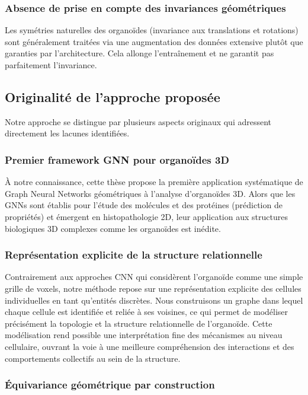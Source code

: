 \subsubsection{Absence de prise en compte des invariances géométriques}

Les symétries naturelles des organoïdes (invariance aux translations et rotations) sont généralement traitées via une augmentation des données extensive plutôt que garanties par l'architecture. Cela allonge l'entraînement et ne garantit pas parfaitement l'invariance.

\subsection{Originalité de l'approche proposée}

Notre approche se distingue par plusieurs aspects originaux qui adressent directement les lacunes identifiées.

\subsubsection{Premier framework GNN pour organoïdes 3D}

À notre connaissance, cette thèse propose la première application systématique de Graph Neural Networks géométriques à l'analyse d'organoïdes 3D. Alors que les GNNs sont établis pour l'étude des molécules et des protéines (prédiction de propriétés) et émergent en histopathologie 2D, leur application aux structures biologiques 3D complexes comme les organoïdes est inédite.

\subsubsection{Représentation explicite de la structure relationnelle}

Contrairement aux approches CNN qui considèrent l’organoïde comme une simple grille de voxels, notre méthode repose sur une représentation explicite des cellules individuelles en tant qu’entités discrètes. Nous construisons un graphe dans lequel chaque cellule est identifiée et reliée à ses voisines, ce qui permet de modéliser précisément la topologie et la structure relationnelle de l’organoïde. Cette modélisation rend possible une interprétation fine des mécanismes au niveau cellulaire, ouvrant la voie à une meilleure compréhension des interactions et des comportements collectifs au sein de la structure.

\subsubsection{Équivariance géométrique par construction}

